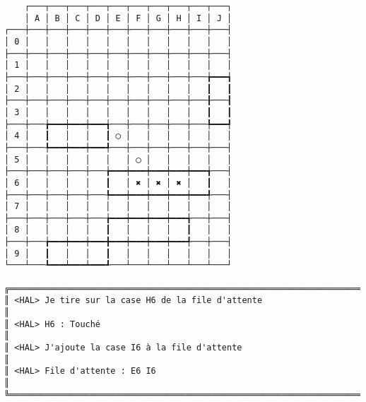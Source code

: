 {\scriptsize
\begin{verbatim}
    ┌───┬───┬───┬───┬───┬───┬───┬───┬───┬───┐
    │ A │ B │ C │ D │ E │ F │ G │ H │ I │ J │
┌───┼───┼───┼───┼───┼───┼───┼───┼───┼───┼───┤
│ 0 │   │   │   │   │   │   │   │   │   │   │
├───┼───┼───┼───┼───┼───┼───┼───┼───┼───┼───┤
│ 1 │   │   │   │   │   │   │   │   │   │   │
├───┼───┼───┼───┼───┼───┼───┼───┼───┼───╆━━━┪
│ 2 │   │   │   │   │   │   │   │   │   ┃   ┃
├───┼───┼───┼───┼───┼───┼───┼───┼───┼───╂───┨
│ 3 │   │   │   │   │   │   │   │   │   ┃   ┃
├───┼───╆━━━┿━━━┿━━━╅───┼───┼───┼───┼───╄━━━┩
│ 4 │   ┃   │   │   ┃ ◯ │   │   │   │   │   │
├───┼───╄━━━┿━━━┿━━━╃───┼───┼───┼───┼───┼───┤
│ 5 │   │   │   │   │   │ ◯ │   │   │   │   │
├───┼───┼───┼───┼───╆━━━┿━━━┿━━━┿━━━┿━━━╅───┤
│ 6 │   │   │   │   ┃   │ ✖ │ ✖ │ ✖ │   ┃   │
├───┼───┼───┼───┼───╄━━━┿━━━┿━━━┿━━━┿━━━╃───┤
│ 7 │   │   │   │   │   │   │   │   │   │   │
├───┼───┼───┼───┼───╆━━━┿━━━┿━━━┿━━━╅───┼───┤
│ 8 │   │   │   │   ┃   │   │   │   ┃   │   │
├───┼───╆━━━┿━━━┿━━━╋━━━┿━━━┿━━━┿━━━╃───┼───┤
│ 9 │   ┃   │   │   ┃   │   │   │   │   │   │
└───┴───┺━━━┷━━━┷━━━┹───┴───┴───┴───┴───┴───┘

╔══════════════════════════════════════════════════════════════════════════════════════════════════╗
║ <HAL> Je tire sur la case H6 de la file d'attente                                                ║
║ <HAL> H6 : Touché                                                                                ║
║ <HAL> J'ajoute la case I6 à la file d'attente                                                    ║
║ <HAL> File d'attente : E6 I6                                                                     ║
╚══════════════════════════════════════════════════════════════════════════════════════════════════╝
\end{verbatim}}
\newpage

